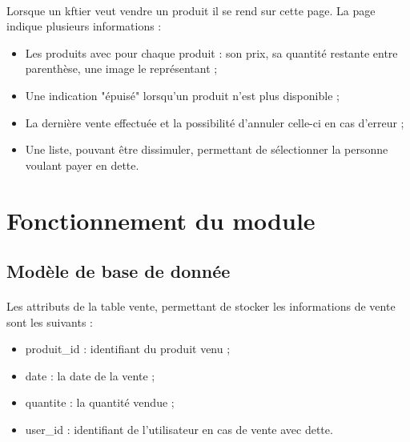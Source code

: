 \documentclass[twoside,UTF8]{EPURapport}
\begin{document}
        \paragraph{}Lorsque un kftier veut vendre un produit il se rend sur cette page. La page indique plusieurs informations : \\
            \begin{itemize}
                \item Les produits avec pour chaque produit : son prix, sa quantité restante entre parenthèse, une image le représentant ;\\
                \item Une indication "épuisé" lorsqu'un produit n'est plus disponible ;\\
                \item La dernière vente effectuée et la possibilité d'annuler celle-ci en cas d'erreur ;\\
                \item Une liste, pouvant être dissimuler, permettant de sélectionner la personne voulant payer en dette.\\
            \end{itemize}

    \section{Fonctionnement du module}

        \subsection{Modèle de base de donnée}

            \paragraph{}Les attributs de la table vente, permettant de stocker les informations de vente sont les suivants :\\
            \begin{itemize}
                \item produit\_id : identifiant du produit venu ;\\
                \item date : la date de la vente ;\\
                \item quantite : la quantité vendue ;\\
                \item user\_id : identifiant de l'utilisateur en cas de vente avec dette.
            \end{itemize}
\end{document}
